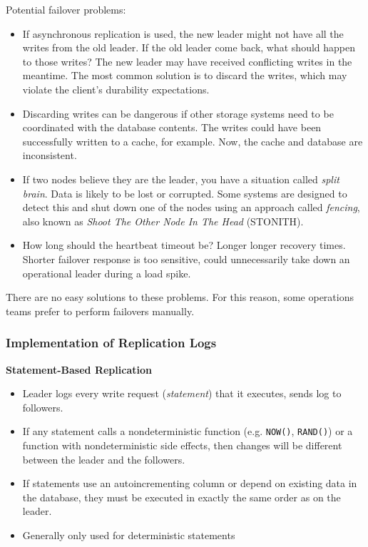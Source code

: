 \documentclass[12pt, titlepage]{article}
\newcommand{\subsubsubsection}[1]{\small \textbf{#1} \medskip}
\begin{document}
Potential failover problems:
\begin{itemize}
	\item If asynchronous replication is used, the new leader might not have all the writes from the old leader. If the old leader come back, what should happen to those writes? The new leader may have received conflicting writes in the meantime. The most common solution is to discard the writes, which may violate the client's durability expectations.
	\item Discarding writes can be dangerous if other storage systems need to be coordinated with the database contents. The writes could have been successfully written to a cache, for example. Now, the cache and database are inconsistent.
	\item If two nodes believe they are the leader, you have a situation called \textit{split brain}. Data is likely to be lost or corrupted. Some systems are designed to detect this and shut down one of the nodes using an approach called \textit{fencing}, also known as \textit{Shoot The Other Node In The Head} (STONITH).
	\item How long should the heartbeat timeout be? Longer \textrightarrow{} longer recovery times. Shorter \textrightarrow{} failover response is too sensitive, could unnecessarily take down an operational leader during a load spike.
\end{itemize}

There are no easy solutions to these problems. For this reason, some operations teams prefer to perform failovers manually.

\subsubsection{Implementation of Replication Logs}

\subsubsubsection{Statement-Based Replication}
\begin{itemize}
	\item Leader logs every write request (\textit{statement}) that it executes, sends log to followers.
	\item If any statement calls a nondeterministic function (e.g. \texttt{NOW()}, \texttt{RAND()}) or a function with nondeterministic side effects, then changes will be different between the leader and the followers.
	\item If statements use an autoincrementing column or depend on existing data in the database, they must be executed in exactly the same order as on the leader.
	\item Generally only used for deterministic statements \\
\end{itemize}
\end{document}
